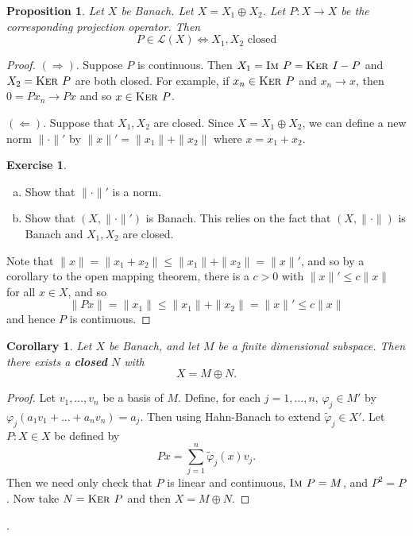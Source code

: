 \documentclass[10pt, oneside, reqno]{amsbook}
\theoremstyle{plain}%
\newtheorem{prop}[thm]{Proposition}
\newtheorem*{cor}{Corollary}
\theoremstyle{definition}
\newtheorem{exer}[thm]{Exercise}
\theoremstyle{remark}
\renewcommand{\phi}{\varphi}
\newcommand{\im}{\textsc{Im\ }}
\renewcommand{\ker}{\textsc{Ker\ }}
\begin{document}
\begin{prop}
    Let $X$ be Banach.  Let $X = X_1 \oplus X_2$.  Let $P : X \rightarrow X$ be the corresponding projection operator.  Then \[
        P \in \mathcal L (X) \iff \text{$X_1, X_2$ closed}
    \]
\end{prop}
\begin{proof}
    $(\Rightarrow)$.  Suppose $P$ is continuous.  Then $X_1 = \im P = \ker I - P$ and $X_2 = \ker P$ are both closed.  For example, if $x_n \in \ker P$ and $x_n \rightarrow x$, then $0 = P x_n \rightarrow Px$ and so $x \in \ker P$.  
    
    $(\Leftarrow)$.  Suppose that $X_1, X_2$ are closed.  Since $X = X_1 \oplus X_2$, we can define a new norm $\| \cdot \|'$ by $\| x \|' = \| x_1 \| + \| x_2 \|$ where $x = x_1 + x_2$.  
    \begin{exer}{\ }
        \begin{enumerate}[(a)]
            \item Show that $\| \cdot \|'$ is a norm.
            \item Show that $(X, \| \cdot \|')$ is Banach.  This relies on the fact that $(X, \| \cdot \|)$ is Banach and $X_1, X_2$ are closed. 
        \end{enumerate}
    \end{exer}
    
    Note that $\| x \| = \| x_1 + x_2 \| \leq \| x_1 \| + \| x_2 \| = \| x \|'$, and so by a corollary to the open mapping theorem, there is a $c > 0$ with $\| x \|' \leq c \| x \|$ for all $x \in X$, and so \[
        \| Px \| = \| x_1 \| \leq \| x_1 \| + \| x_2 \| = \| x \|' \leq c \| x \|
    \] and hence $P$ is continuous.  
\end{proof}




\begin{cor}
    Let $X$ be Banach, and let $M$ be a finite dimensional subspace.  Then there exists a \textbf{closed} $N$ with \[
        X = M \oplus N.
    \]
\end{cor}
\begin{proof}
    Let $v_1, \dots, v_n$ be a basis of $M$.  Define, for each $ j = 1, \dots, n$, $\phi_j \in M'$ by $\phi_j(a_1 v_1 + \dots + a_n v_n) = a_j$.  Then using Hahn-Banach to extend $\tilde \phi_j \in X'$.  Let $P : X \in X$ be defined by \[
        Px = \sum_{j =1 }^n \tilde \phi_j(x) v_j.
    \]  Then we need only check that $P$ is linear and continuous, $\im P = M$, and $P^2 = P$. Now take $N = \ker P$ and then $X = M \oplus N$.
\end{proof}.
\end{document}
